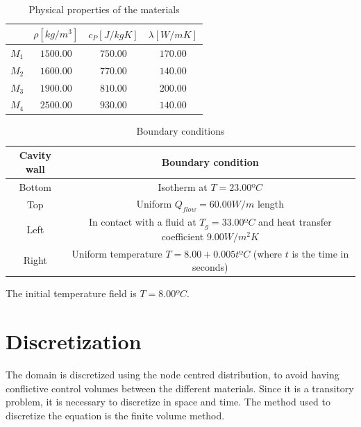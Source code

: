 \begin{table}[h!]
	\centering
	\begin{tabular}{ |c|c|c|c| }
		\hline
		& $\rho [kg/m^{3}]$ & $c_{P} [J/kgK]$ & $\lambda [W/mK]$ \\ \hline
		$M_{1}$ & $1500.00$ & $750.00$ & $170.00$ \\ \hline
		$M_{2}$ & $1600.00$ & $770.00$ & $140.00$ \\ \hline
		$M_{3}$ & $1900.00$ & $810.00$ & $200.00$ \\ \hline
		$M_{4}$ & $2500.00$ & $930.00$ & $140.00$ \\ \hline
	\end{tabular}
\caption{Physical properties of the materials}
\end{table}
\begin{table}
	\centering
	\begin{tabular}{ |c|c|}
		\hline
		Cavity wall & Boundary condition \\ \hline
		Bottom & Isotherm at $T=23.00 ºC$ \\ \hline
		Top & Uniform $Q_{flow}=60.00 W/m$ length \\ \hline
		Left & In contact with a fluid at $T_{g}=33.00 ºC$ and heat transfer coefficient $9.00 W/m^{2}K$ \\ \hline
		Right & Uniform temperature $T=8.00+0.005t ºC$ (where $t$ is the time in seconds) \\ \hline
	\end{tabular}
\caption{Boundary conditions}
\end{table}

The initial temperature field is $T=8.00 ºC$.

\section{Discretization}
The domain is discretized using the node centred distribution, to avoid having conflictive control volumes between the different materials. Since it is a transitory problem, it is necessary to discretize in space and time. The method used to discretize the equation is the finite volume method.

